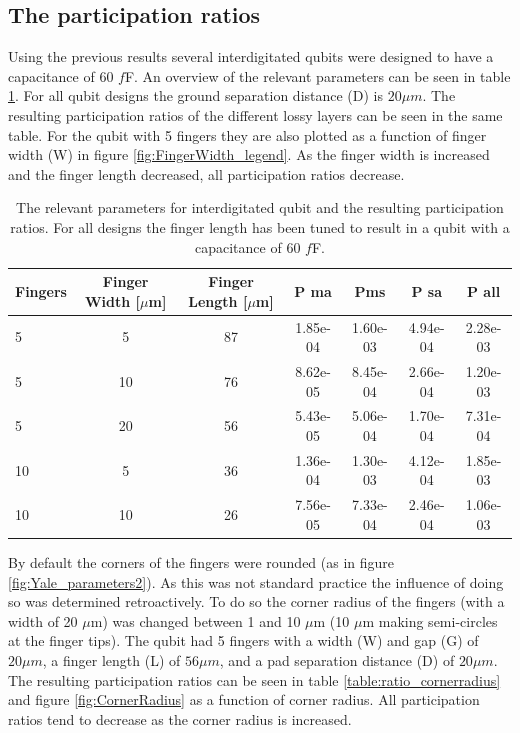 \subsection{The participation ratios}
Using the previous results several interdigitated qubits were designed to have a capacitance of 60 \(f\)F. An overview of the relevant parameters can be seen in table \ref{table:60fF_fingerlength}. For all qubit designs the ground separation distance (D) is \(20 \mu m\). The resulting participation ratios of the different lossy layers can be seen in the same table. For the qubit with 5 fingers they are also plotted as a function of finger width (W) in figure \ref{fig:FingerWidth_legend}. As the finger width is increased and the finger length decreased, all participation ratios decrease.

\begin{table}
	\begin{center}
		\begin{tabular}{ | l || c | c || c | c | c | c |}
			\hline
			Fingers  & Finger Width [\(\mu\)m] & Finger Length [\(\mu\)m]  & P ma &  Pms & P sa & P all \\ \hline
			5 & 5 & 87 & 1.85e-04 & 1.60e-03 & 4.94e-04 & 2.28e-03 \\  
			5 & 10 & 76 & 8.62e-05 & 8.45e-04 & 2.66e-04 & 1.20e-03 \\
			5 & 20 & 56 & 5.43e-05 & 5.06e-04 & 1.70e-04 & 7.31e-04  \\
			10 & 5 & 36 & 1.36e-04 & 1.30e-03 & 4.12e-04 & 1.85e-03 \\
			10 & 10 & 26 & 7.56e-05 & 7.33e-04 & 2.46e-04 & 1.06e-03 \\
			\hline
		\end{tabular}
	\end{center}
	\caption{The relevant parameters for interdigitated qubit and the resulting participation ratios. For all designs the finger length has been tuned to result in a qubit with a capacitance of 60 \(f\)F. }
	\label{table:60fF_fingerlength}
\end{table}



By default the corners of the fingers were rounded (as in figure \ref{fig:Yale_parameters2}). As this was not standard practice the influence of doing so was determined retroactively. To do so the corner radius of the fingers (with a width of 20 \(\mu\)m) was changed between 1 and 10 \(\mu\)m (10 \(\mu\)m making semi-circles at the finger tips). The qubit had 5 fingers with a width (W) and gap (G) of \(20 \mu m\), a finger length (L) of \(56 \mu m\), and a pad separation distance (D) of \(20 \mu m\). The resulting participation ratios can be seen in table \ref{table:ratio_cornerradius} and figure \ref{fig:CornerRadius} as a function of corner radius. All participation ratios tend to decrease as the corner radius is increased. 

